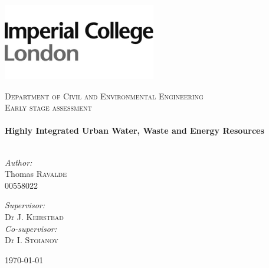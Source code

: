 \begin{titlepage}


\includegraphics[width=0.5\textwidth]{./img/ImperialLogo.jpg}\\[1cm]

\begin{center}

\textsc{\large Department of Civil and Environmental Engineering}\\[1.5cm]

\textsc{\Large Early stage assessment}\\[0.5cm]

\HRule \\[0.4cm]
{ \LARGE \bfseries Highly Integrated Urban Water, Waste and Energy Resources}\\[0.4cm]

\HRule \\[1.5cm]

\begin{minipage}{0.5\textwidth}
\begin{flushleft} \large
\emph{Author:}\\
Thomas \textsc{Ravalde}\\
00558022 \\
\end{flushleft}
\end{minipage}
\begin{minipage}{0.4\textwidth}
\begin{flushright} \large
\emph{Supervisor:} \\
Dr J. \textsc{Keirstead} \\
\emph{Co-supervisor:} \\
Dr I. \textsc{Stoianov} \\
\end{flushright}
\end{minipage}

\vfill

{\today}

\end{center}

\end{titlepage}
